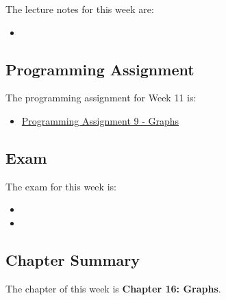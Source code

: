 \noindent The lecture notes for this week are:

\begin{itemize}
    \item {}
\end{itemize}

\subsection{Programming Assignment}

The programming assignment for Week 11 is:

\begin{itemize}
    \item \href{https://github.com/QuantumCompiler/CU/tree/main/CSPB%202270%20-%20Data%20Structures/Assignments/Assignment%209%20-%20Graphs}{Programming Assignment 9 - Graphs}
\end{itemize}

\subsection{Exam}

The exam for this week is:

\begin{itemize}
    \item {}
    \item {}
\end{itemize}

\subsection{Chapter Summary}

The chapter of this week is \textbf{Chapter 16: Graphs}.

